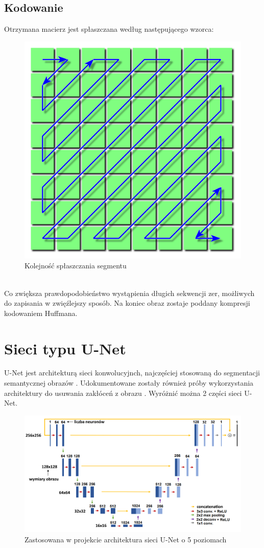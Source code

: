 \documentclass[a4paper, 12pt]{article}
\begin{document}
\subsection{Kodowanie}
Otrzymana macierz jest spłaszczana według następującego wzorca:
\begin{figure}[h!]
	\begin{center}
	\includegraphics[width=0.5\columnwidth]{pattern.png}
	\caption{Kolejność spłaszczania segmentu}
\end{center}
\end{figure}
\\
Co zwiększa prawdopodobieństwo wystąpienia długich sekwencji zer, możliwych do zapisania w zwięźlejszy sposób.
Na koniec obraz zostaje poddany kompresji kodowaniem Huffmana.
\newpage
\section{Sieci typu U-Net}
U-Net jest architekturą sieci konwolucyjnch, najczęściej stosowaną do segmentacji semantycznej obrazów \cite{ronneberger2015unet}.
Udokumentowane zostały również próby wykorzystania architektury do usuwania zakłóceń z obrazu \cite{antholzer2018deep} .
Wyróżnić można 2 części sieci U-Net.
\begin{figure}[h!]
	\begin{center}
	\includegraphics[width=0.9\columnwidth]{unet.png}
	\caption{Zastosowana w projekcie architektura sieci U-Net o 5 poziomach}
\end{center}
\end{figure}
\end{document}
